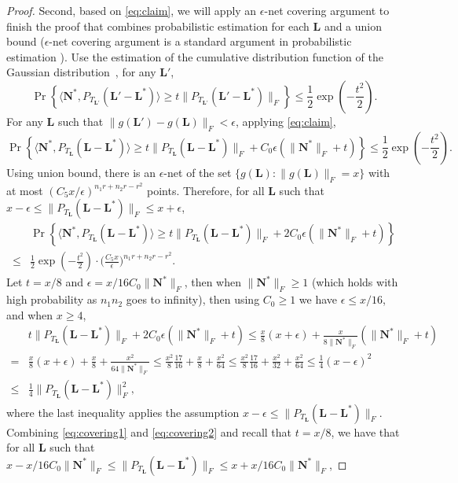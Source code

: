 \documentclass[12pt]{article}
\newcommand{\bL}{\boldsymbol{L}}
\def\bN{\boldsymbol{N}}
\theoremstyle{plain}
\theoremstyle{definition}
\theoremstyle{plain}
\theoremstyle{plain}
\theoremstyle{remark}
\begin{document}
\begin{proof}
Second, based on \eqref{eq:claim}, we will apply an $\epsilon$-net covering argument to finish the proof that combines probabilistic estimation for each $\bL$ and a union bound ($\epsilon$-net covering argument is a standard argument in probabilistic estimation \cite{vershynin12}). Use the estimation of the cumulative distribution function of the Gaussian distribution~\cite[pg 8]{ledoux1991probability}, for any $\bL'$,
\[
\Pr\left\{\langle\bN^*, P_{T_{\bL'}} (\bL'-\bL^*)\rangle\geq t\|P_{T_{\bL'}} (\bL'-\bL^*)\|_F\right\}\leq \frac{1}{2}\exp\left(-\frac{t^2}{2}\right).
\]
For any $\bL$ such that $\|g(\bL')-g(\bL)\|_F<\epsilon$, applying \eqref{eq:claim},
\[
\Pr\left\{\langle\bN^*, P_{T_{\bL}} (\bL-\bL^*)\rangle\geq t\|P_{T_{\bL}} (\bL-\bL^*)\|_F+C_0\epsilon(\|\bN^*\|_F+t) \right\}\leq \frac{1}{2}\exp\left(-\frac{t^2}{2}\right).
\]
Using union bound, there is an $\epsilon$-net of the set $\{g(\bL):\|g(\bL)\|_F=x\}$ with at most $(C_5x/\epsilon)^{n_1r+n_2r-r^2}$ points.  Therefore, for all $\bL$ such that $x-\epsilon\leq \|P_{T_{\bL}} (\bL-\bL^*)\|_F\leq x+\epsilon$, 
\begin{align}
 & \Pr\left\{ \langle\bN^{*},P_{T_{\bL}}(\bL-\bL^{*})\rangle\geq t\|P_{T_{\bL}}(\bL-\bL^{*})\|_{F}+2C_{0}\epsilon(\|\bN^{*}\|_{F}+t)\right\} \nonumber\\
\leq & \frac{1}{2}\exp\left(-\frac{t^{2}}{2}\right)\cdot\Big(\frac{C_{5}x}{\epsilon}\Big)^{n_{1}r+n_{2}r-r^{2}}.\label{eq:covering1}
\end{align}
Let $t=x/8$ and $\epsilon=x/16C_0\|\bN^*\|_F$, then when $\|\bN^*\|_F\geq 1$ (which holds with high probability as $n_1n_2$ goes to infinity), then using $C_0\geq 1$ we have $\epsilon\leq x/16$, and when $x\geq 4$,
\begin{align}\nonumber
&t\|P_{T_{\bL}} (\bL-\bL^*)\|_F+2C_0\epsilon(\|\bN^*\|_F+t) 
\leq \frac{x}{8}(x+\epsilon)+\frac{x}{8\|\bN^*\|_F}(\|\bN^*\|_F+t)
\\\nonumber=& \frac{x}{8}(x+\epsilon)+\frac{x}{8}+\frac{x^2}{64\|\bN^*\|_F}\nonumber
\leq  \frac{x^2}{8}\frac{17}{16}+\frac{x}{8}+\frac{x^2}{64}\leq \frac{x^2}{8}\frac{17}{16}+\frac{x^2}{32}+\frac{x^2}{64} 
\leq  \frac{1}{4}(x-\epsilon)^2\\\leq&  \frac{1}{4}\|P_{T_{\bL}} (\bL-\bL^*)\|_F^2,\label{eq:covering2}
\end{align}
where the last inequality applies the assumption  $x-\epsilon\leq \|P_{T_{\bL}} (\bL-\bL^*)\|_F$.
Combining \eqref{eq:covering1} and \eqref{eq:covering2} and recall that $t=x/8$, we have that for all $\bL$ such that $x-x/16C_0\|\bN^*\|_F\leq \|P_{T_{\bL}} (\bL-\bL^*)\|_F\leq x+x/16C_0\|\bN^*\|_F$, 

\end{proof}
\end{document}

